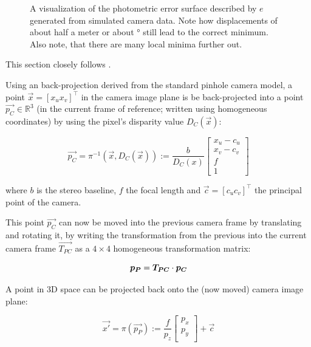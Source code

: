 \begin{figure}
\begin{minipage}[t]{0.48\textwidth}
    \end{minipage}
    \caption{A visualization of the photometric error surface described by $e$
    generated from simulated camera data. Note how displacements of about half
a meter or about \unit[5]{\degree} still lead to the correct minimum. Also
note, that there are many local minima further out.}
    \label{fig:costsurface_big}
\end{figure}

This section closely follows \cite{omaridenseodometry}.

Using an back-projection derived from the standard pinhole camera model, a
point $ \vec{x} = [ x_u  x_v ]^\intercal $ in the camera image plane is be back-projected into a point $
\vec{p_C} \in \mathbb{R}^3 $ (in the current frame of reference; written using
homogeneous coordinates) by using the pixel's disparity value $D_C(\vec{x})$:

\begin{equation}
    \label{eq:backprojection}
    \vec{p_C} = \pi^{-1}(\vec{x}, D_C(\vec{x})) := \frac{b}{D_C(x)}
    \begin{bmatrix}
        x_u - c_u \\
        x_v - c_v \\
        f \\
        1
    \end{bmatrix}
\end{equation}

where $b$ is the stereo baseline, $f$ the focal length and $\vec{c} = [ c_u c_v ]^\intercal$ the principal point of the camera.

This point $\vec{p_C}$ can now be moved into the previous camera frame by translating
and rotating it, by writing the transformation from the previous into the
current camera frame $\vec{T_{PC}}$ as a $4 \times 4$ homogeneous
transformation matrix:

\begin{equation}
    \vec{p_P} = \mat{T_{PC}} \cdot \vec{p_C}
\end{equation}

A point in 3D space can be projected back onto the (now moved) camera image plane:

\begin{equation}
    \label{eq:projection}
    \vec{x'} = \pi(\vec{p_P}) := \frac{f}{p_{z}}
    \begin{bmatrix}
        p_{x} \\
        p_{y} \\
    \end{bmatrix}
    + \vec{c}
\end{equation}

